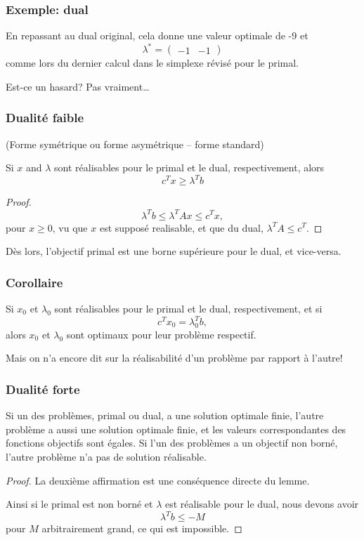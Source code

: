 \documentclass[usepdftitle=false]{beamer}
\begin{document}
\begin{frame}
\frametitle{Exemple: dual}

En repassant au dual original, cela donne une valeur optimale de -9 et
\[
\lambda^* =
\begin{pmatrix}
-1 & -1
\end{pmatrix}
\]
comme lors du dernier calcul dans le simplexe révisé pour le primal.

\mbox{}

Est-ce un hasard? Pas vraiment\ldots

\end{frame}

\begin{frame}
\frametitle{Dualité faible}

(Forme symétrique ou forme asymétrique -- forme standard)

\mbox{}

Si $x$ and $\lambda$ sont réalisables pour le primal et le dual, respectivement, alors
\[
c^T x \geq \lambda^T b
\]

\begin{proof}
\[
\lambda^T b \leq \lambda^TAx \leq c^Tx,
\]
pour $x \geq 0$, vu que $x$ est supposé realisable, et que du dual, $\lambda^T A \leq c^T$.
\end{proof}

Dès lors, l'objectif primal est une borne supérieure pour le dual, et vice-versa.

\end{frame}

\begin{frame}
\frametitle{Corollaire}

Si $x_0$ et $\lambda_0$ sont réalisables pour le primal et le dual, respectivement, et si
\[
c^T x_0 = \lambda_0^T b,
\]
alors $x_0$ et $\lambda_0$ sont optimaux pour leur problème respectif.

\mbox{}

Mais on n'a encore dit sur la réalisabilité d'un problème par rapport à l'autre!

\end{frame}

\begin{frame}
\frametitle{Dualité forte}

Si un des problèmes, primal ou dual, a une solution optimale finie, l'autre problème a aussi une solution optimale finie, et les valeurs correspondantes des fonctions objectifs sont égales. Si l'un des problèmes a un objectif non borné, l'autre problème n'a pas de solution réalisable.

\begin{proof}
La deuxième affirmation est une conséquence directe du lemme.

\mbox{}

Ainsi si le primal est non borné et $\lambda$ est réalisable pour le dual, nous devons avoir
\[
\lambda^T b \leq -M
\]
pour $M$ arbitrairement grand, ce qui est impossible.

\end{proof}

\end{frame}
\end{document}
